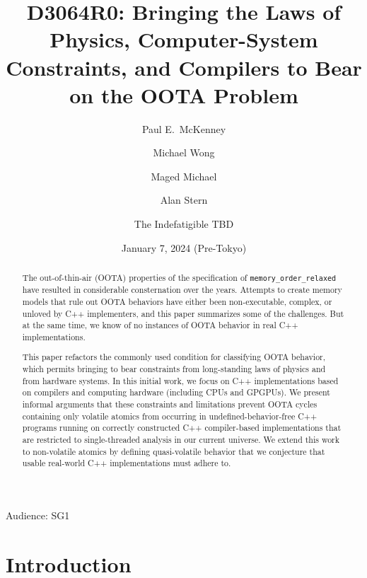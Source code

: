 \documentclass[10]{article}
\begin{document}
\title{D3064R0: Bringing the Laws of Physics, Computer-System Constraints, and Compilers to Bear on the OOTA Problem}

\newcommand{\co}[1]{\lstinline[breaklines=yes,breakatwhitespace=yes]{#1}}

\author{
Paul E.~McKenney\\ \and
Michael Wong\\ \and
Maged Michael\\ \and
Alan Stern\\ \and
The Indefatigible TBD
}
\date{January 7, 2024 (Pre-Tokyo)}
\maketitle{}

Audience: SG1

\begin{abstract}
	The out-of-thin-air (OOTA) properties of the specification
	of \co{memory_order_relaxed} have resulted in considerable
	consternation over the years.
	Attempts to create memory models that rule out OOTA behaviors
	have either been non-executable, complex, or unloved by C++
	implementers, and this paper summarizes some of the challenges.
	But at the same time, we know of no instances of OOTA behavior
	in real C++ implementations.

	This paper refactors the commonly used condition for classifying
	OOTA behavior, which permits bringing to bear constraints from
	long-standing laws of physics and from hardware systems.
	In this initial work, we focus on C++ implementations based
	on compilers and computing hardware (including CPUs and GPGPUs).
	We present informal arguments that these constraints and
	limitations prevent OOTA cycles containing only volatile atomics
	from occurring in undefined-behavior-free C++ programs running on
	correctly constructed C++ compiler-based implementations that are
	restricted to single-threaded analysis in our current universe.
	We extend this work to non-volatile atomics by defining
	quasi-volatile behavior that we conjecture that usable real-world
	C++ implementations must adhere to.
\end{abstract}

\pagebreak

\tableofcontents

\pagebreak

\section{Introduction}
\label{sec:Introduction}
\end{document}

